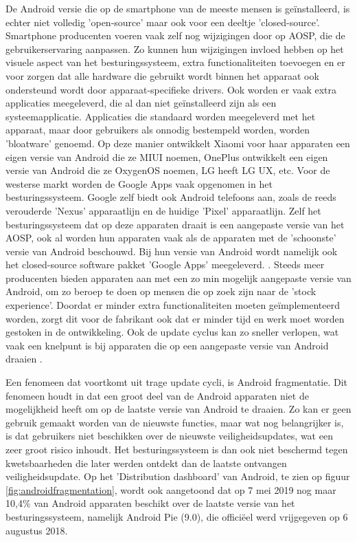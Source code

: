 De Android versie die op de smartphone van de meeste mensen is geïnstalleerd, is echter niet volledig 'open-source' maar ook voor een deeltje 'closed-source'. Smartphone producenten voeren vaak zelf nog wijzigingen door op AOSP, die de gebruikerservaring aanpassen. Zo kunnen hun wijzigingen invloed hebben op het visuele aspect van het besturingssysteem, extra functionaliteiten toevoegen en er voor zorgen dat alle hardware die gebruikt wordt binnen het apparaat ook ondersteund wordt door apparaat-specifieke drivers. Ook worden er vaak extra applicaties meegeleverd, die al dan niet geïnstalleerd zijn als een systeemapplicatie. Applicaties die standaard worden meegeleverd met het apparaat, maar door gebruikers als onnodig bestempeld worden, worden 'bloatware' genoemd. Op deze manier ontwikkelt Xiaomi voor haar apparaten een eigen versie van Android die ze MIUI noemen, OnePlus ontwikkelt een eigen versie van Android die ze OxygenOS noemen, LG heeft LG UX, etc. Voor de westerse markt worden de Google Apps vaak opgenomen in het besturingssysteem. Google zelf biedt ook Android telefoons aan, zoals de reeds verouderde 'Nexus' apparaatlijn en de huidige 'Pixel' apparaatlijn. Zelf het besturingssysteem dat op deze apparaten draait is een aangepaste versie van het AOSP, ook al worden hun apparaten vaak als de apparaten met de 'schoonste' versie van Android beschouwd. Bij hun versie van Android wordt namelijk ook het closed-source software pakket 'Google Apps' meegeleverd. \autocite{torres_stockandroid}. Steeds meer producenten bieden apparaten aan met een zo min mogelijk aangepaste versie van Android, om zo beroep te doen op mensen die op zoek zijn naar de 'stock experience'. Doordat er minder extra functionaliteiten moeten geïmplementeerd worden, zorgt dit voor de fabrikant ook dat er minder tijd en werk moet worden gestoken in de ontwikkeling. Ook de update cyclus kan zo sneller verlopen, wat vaak een knelpunt is bij apparaten die op een aangepaste versie van Android draaien \autocite{manik_slow-updates}. 

Een fenomeen dat voortkomt uit trage update cycli, is Android fragmentatie. Dit fenomeen houdt in dat een groot deel van de Android apparaten niet de mogelijkheid heeft om op de laatste versie van Android te draaien. Zo kan er geen gebruik gemaakt worden van de nieuwste functies, maar wat nog belangrijker is, is dat gebruikers niet beschikken over de nieuwste veiligheidsupdates, wat een zeer groot risico inhoudt. Het besturingssysteem is dan ook niet beschermd tegen kwetsbaarheden die later werden ontdekt dan de laatste ontvangen veiligheidsupdate. Op het 'Distribution dashboard' van Android, te zien op figuur \ref{fig:androidfragmentation}, wordt ook aangetoond dat op 7 mei 2019 nog maar 10,4\% van Android apparaten beschikt over de laatste versie van het besturingssysteem, namelijk Android Pie (9.0), die officiëel werd vrijgegeven op 6 augustus 2018.

